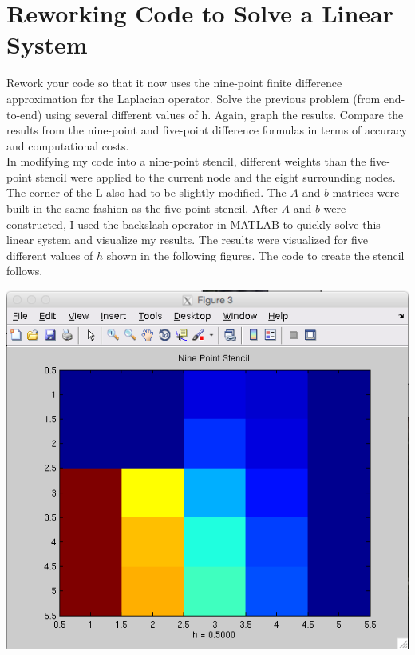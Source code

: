 \documentclass[11pt, oneside]{article}   	%
\begin{document}
\section{Reworking Code to Solve a Linear System}

Rework your code so that it now uses the nine-point finite difference approximation for the Laplacian operator. Solve the previous problem (from end-to-end) using several different values of h. Again, graph the results. Compare the results from the nine-point and five-point difference formulas in terms of accuracy and computational costs. \\

In modifying my code into a nine-point stencil, different weights than the five-point stencil were applied to the current node and the eight surrounding nodes. The corner of the L also had to be slightly modified. The $A$ and $b$ matrices were built in the same fashion as the five-point stencil. After $A$ and $b$ were constructed, I used the backslash operator in MATLAB to quickly solve this linear system and visualize my results. The results were visualized for five different values of $h$ shown in the following figures. The code to create the stencil follows. \\

\centerline{\includegraphics[scale = 0.55]{NinePoint_h1.png}}
\end{document}
